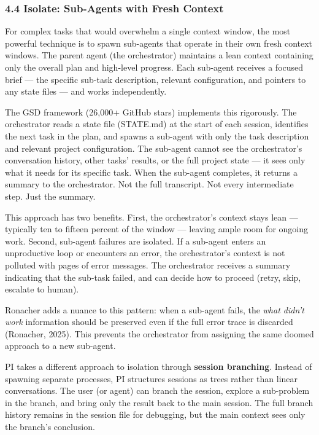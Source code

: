 \documentclass[11pt, a4paper]{article}
\begin{document}
\hypertarget{isolate-sub-agents-with-fresh-context}{%
\subsubsection{4.4 Isolate: Sub-Agents with Fresh
Context}\label{isolate-sub-agents-with-fresh-context}}

For complex tasks that would overwhelm a single context window, the most
powerful technique is to spawn sub-agents that operate in their own
fresh context windows. The parent agent (the orchestrator) maintains a
lean context containing only the overall plan and high-level progress.
Each sub-agent receives a focused brief --- the specific sub-task
description, relevant configuration, and pointers to any state files ---
and works independently.

The GSD framework (26,000+ GitHub stars) implements this rigorously. The
orchestrator reads a state file (STATE.md) at the start of each session,
identifies the next task in the plan, and spawns a sub-agent with only
the task description and relevant project configuration. The sub-agent
cannot see the orchestrator's conversation history, other tasks'
results, or the full project state --- it sees only what it needs for
its specific task. When the sub-agent completes, it returns a summary to
the orchestrator. Not the full transcript. Not every intermediate step.
Just the summary.

This approach has two benefits. First, the orchestrator's context stays
lean --- typically ten to fifteen percent of the window --- leaving
ample room for ongoing work. Second, sub-agent failures are isolated. If
a sub-agent enters an unproductive loop or encounters an error, the
orchestrator's context is not polluted with pages of error messages. The
orchestrator receives a summary indicating that the sub-task failed, and
can decide how to proceed (retry, skip, escalate to human).

Ronacher adds a nuance to this pattern: when a sub-agent fails, the
\emph{what didn't work} information should be preserved even if the full
error trace is discarded (Ronacher, 2025). This prevents the
orchestrator from assigning the same doomed approach to a new sub-agent.

PI takes a different approach to isolation through \textbf{session
branching}. Instead of spawning separate processes, PI structures
sessions as trees rather than linear conversations. The user (or agent)
can branch the session, explore a sub-problem in the branch, and bring
only the result back to the main session. The full branch history
remains in the session file for debugging, but the main context sees
only the branch's conclusion.
\end{document}
